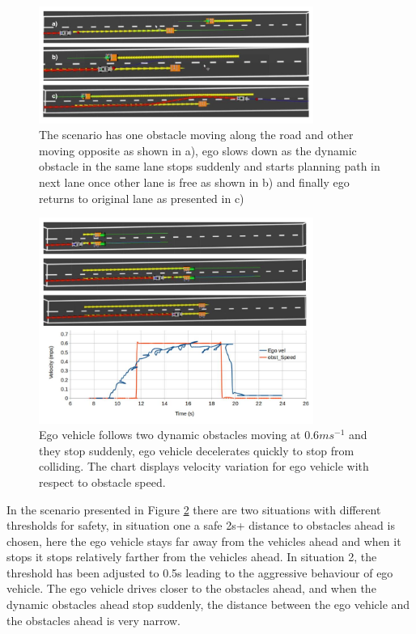 \fi
\begin{figure}
    \centering
    \includegraphics[width=0.8\textwidth]{Images/evaluation/sudden_Stop_dyn_1.jpg}
    \caption{The scenario has one obstacle moving along the road and other moving opposite as shown in a), ego slows down as the dynamic obstacle in the same lane stops suddenly and starts planning path in next lane once other lane is free as shown in b) and finally ego returns to original lane as presented in c) }
    \label{dynamic_1}
\end{figure}

\begin{figure}
	\centering
	\includegraphics[width=0.8\textwidth]{Images/evaluation/sudden_stopping_lane_blocked_2.jpg}
	\caption{Ego vehicle follows two dynamic obstacles moving at $0.6ms^{-1}$ and they stop suddenly, ego vehicle decelerates quickly to stop from colliding. The chart displays velocity variation for ego vehicle with respect to obstacle speed.}
	\label{dynamic_2}
\end{figure}



In the scenario presented in Figure \ref{dynamic_2} there are two situations with different thresholds for safety, in situation one a safe 2s+ distance to obstacles ahead is chosen, here the ego vehicle stays far away from the vehicles ahead and when it stops it stops relatively farther from the vehicles ahead. In situation 2, the threshold has been adjusted to 0.5s leading to the aggressive behaviour of ego vehicle. The ego vehicle drives closer to the obstacles ahead, and when the dynamic obstacles ahead stop suddenly, the distance between the ego vehicle and the obstacles ahead is very narrow.   


